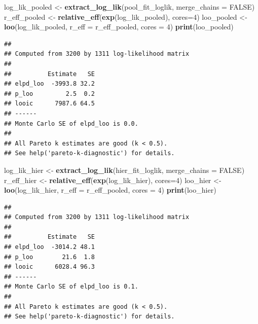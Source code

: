 \documentclass[
]{article}
\newenvironment{Shaded}{\begin{snugshade}}{\end{snugshade}}
\newcommand{\DataTypeTok}[1]{\textcolor[rgb]{0.13,0.29,0.53}{#1}}
\newcommand{\DecValTok}[1]{\textcolor[rgb]{0.00,0.00,0.81}{#1}}
\newcommand{\KeywordTok}[1]{\textcolor[rgb]{0.13,0.29,0.53}{\textbf{#1}}}
\newcommand{\NormalTok}[1]{#1}
\newcommand{\OtherTok}[1]{\textcolor[rgb]{0.56,0.35,0.01}{#1}}
\newcommand{\StringTok}[1]{\textcolor[rgb]{0.31,0.60,0.02}{#1}}
\begin{document}
\begin{Shaded}
\begin{Highlighting}[]
\NormalTok{log\_lik\_pooled \textless{}{-}}\StringTok{ }\KeywordTok{extract\_log\_lik}\NormalTok{(pool\_fit\_loglik, }\DataTypeTok{merge\_chains =} \OtherTok{FALSE}\NormalTok{)}
\NormalTok{r\_eff\_pooled \textless{}{-}}\StringTok{ }\KeywordTok{relative\_eff}\NormalTok{(}\KeywordTok{exp}\NormalTok{(log\_lik\_pooled), }\DataTypeTok{cores=}\DecValTok{4}\NormalTok{)}
\NormalTok{loo\_pooled \textless{}{-}}\StringTok{ }\KeywordTok{loo}\NormalTok{(log\_lik\_pooled, }\DataTypeTok{r\_eff =}\NormalTok{ r\_eff\_pooled, }\DataTypeTok{cores =} \DecValTok{4}\NormalTok{)}
\KeywordTok{print}\NormalTok{(loo\_pooled)}
\end{Highlighting}
\end{Shaded}

\begin{verbatim}
## 
## Computed from 3200 by 1311 log-likelihood matrix
## 
##          Estimate   SE
## elpd_loo  -3993.8 32.2
## p_loo         2.5  0.2
## looic      7987.6 64.5
## ------
## Monte Carlo SE of elpd_loo is 0.0.
## 
## All Pareto k estimates are good (k < 0.5).
## See help('pareto-k-diagnostic') for details.
\end{verbatim}

\begin{Shaded}
\begin{Highlighting}[]
\NormalTok{log\_lik\_hier \textless{}{-}}\StringTok{ }\KeywordTok{extract\_log\_lik}\NormalTok{(hier\_fit\_loglik, }\DataTypeTok{merge\_chains =} \OtherTok{FALSE}\NormalTok{)}
\NormalTok{r\_eff\_hier \textless{}{-}}\StringTok{ }\KeywordTok{relative\_eff}\NormalTok{(}\KeywordTok{exp}\NormalTok{(log\_lik\_hier), }\DataTypeTok{cores=}\DecValTok{4}\NormalTok{)}
\NormalTok{loo\_hier \textless{}{-}}\StringTok{ }\KeywordTok{loo}\NormalTok{(log\_lik\_hier, }\DataTypeTok{r\_eff =}\NormalTok{ r\_eff\_pooled, }\DataTypeTok{cores =} \DecValTok{4}\NormalTok{)}
\KeywordTok{print}\NormalTok{(loo\_hier)}
\end{Highlighting}
\end{Shaded}

\begin{verbatim}
## 
## Computed from 3200 by 1311 log-likelihood matrix
## 
##          Estimate   SE
## elpd_loo  -3014.2 48.1
## p_loo        21.6  1.8
## looic      6028.4 96.3
## ------
## Monte Carlo SE of elpd_loo is 0.1.
## 
## All Pareto k estimates are good (k < 0.5).
## See help('pareto-k-diagnostic') for details.
\end{verbatim}
\end{document}
